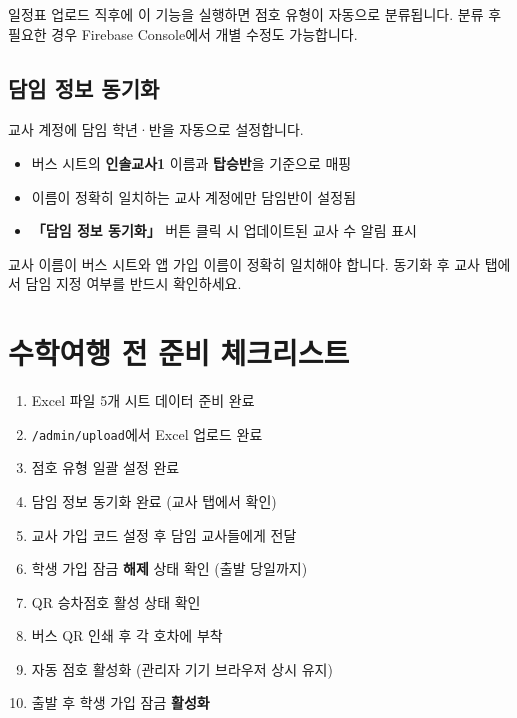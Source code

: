 \documentclass[a4paper,11pt]{article}
\begin{document}
\begin{tcolorbox}[tipbox]
일정표 업로드 직후에 이 기능을 실행하면 점호 유형이 자동으로 분류됩니다.
분류 후 필요한 경우 Firebase Console에서 개별 수정도 가능합니다.
\end{tcolorbox}

\subsection{담임 정보 동기화}

교사 계정에 담임 학년·반을 자동으로 설정합니다.

\begin{itemize}
  \item 버스 시트의 \textbf{인솔교사1} 이름과 \textbf{탑승반}을 기준으로 매핑
  \item 이름이 정확히 일치하는 교사 계정에만 담임반이 설정됨
  \item \textbf{「담임 정보 동기화」} 버튼 클릭 시 업데이트된 교사 수 알림 표시
\end{itemize}

\begin{tcolorbox}[warnbox]
교사 이름이 버스 시트와 앱 가입 이름이 정확히 일치해야 합니다.
동기화 후 교사 탭에서 담임 지정 여부를 반드시 확인하세요.
\end{tcolorbox}

\section{수학여행 전 준비 체크리스트}

\begin{tcolorbox}[infobox]
\begin{enumerate}
  \item[\checkmark] Excel 파일 5개 시트 데이터 준비 완료
  \item[\checkmark] \texttt{/admin/upload}에서 Excel 업로드 완료
  \item[\checkmark] 점호 유형 일괄 설정 완료
  \item[\checkmark] 담임 정보 동기화 완료 (교사 탭에서 확인)
  \item[\checkmark] 교사 가입 코드 설정 후 담임 교사들에게 전달
  \item[\checkmark] 학생 가입 잠금 \textbf{해제} 상태 확인 (출발 당일까지)
  \item[\checkmark] QR 승차점호 활성 상태 확인
  \item[\checkmark] 버스 QR 인쇄 후 각 호차에 부착
  \item[\checkmark] 자동 점호 활성화 (관리자 기기 브라우저 상시 유지)
  \item[\checkmark] 출발 후 학생 가입 잠금 \textbf{활성화}
\end{enumerate}
\end{tcolorbox}
\end{document}
